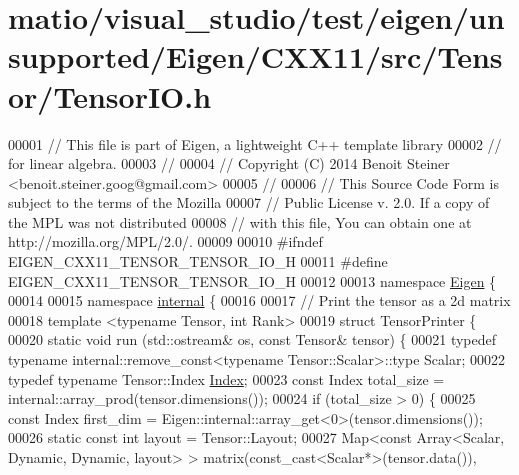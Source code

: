 \hypertarget{matio_2visual__studio_2test_2eigen_2unsupported_2_eigen_2_c_x_x11_2src_2_tensor_2_tensor_i_o_8h_source}{}\section{matio/visual\+\_\+studio/test/eigen/unsupported/\+Eigen/\+C\+X\+X11/src/\+Tensor/\+Tensor\+IO.h}
\label{matio_2visual__studio_2test_2eigen_2unsupported_2_eigen_2_c_x_x11_2src_2_tensor_2_tensor_i_o_8h_source}

\begin{DoxyCode}
00001 \textcolor{comment}{// This file is part of Eigen, a lightweight C++ template library}
00002 \textcolor{comment}{// for linear algebra.}
00003 \textcolor{comment}{//}
00004 \textcolor{comment}{// Copyright (C) 2014 Benoit Steiner <benoit.steiner.goog@gmail.com>}
00005 \textcolor{comment}{//}
00006 \textcolor{comment}{// This Source Code Form is subject to the terms of the Mozilla}
00007 \textcolor{comment}{// Public License v. 2.0. If a copy of the MPL was not distributed}
00008 \textcolor{comment}{// with this file, You can obtain one at http://mozilla.org/MPL/2.0/.}
00009 
00010 \textcolor{preprocessor}{#ifndef EIGEN\_CXX11\_TENSOR\_TENSOR\_IO\_H}
00011 \textcolor{preprocessor}{#define EIGEN\_CXX11\_TENSOR\_TENSOR\_IO\_H}
00012 
00013 \textcolor{keyword}{namespace }\hyperlink{namespace_eigen}{Eigen} \{
00014 
00015 \textcolor{keyword}{namespace }\hyperlink{namespaceinternal}{internal} \{
00016 
00017 \textcolor{comment}{// Print the tensor as a 2d matrix}
00018 \textcolor{keyword}{template} <\textcolor{keyword}{typename} Tensor, \textcolor{keywordtype}{int} Rank>
00019 \textcolor{keyword}{struct }TensorPrinter \{
00020   \textcolor{keyword}{static} \textcolor{keywordtype}{void} run (std::ostream& os, \textcolor{keyword}{const} Tensor& tensor) \{
00021     \textcolor{keyword}{typedef} \textcolor{keyword}{typename} internal::remove\_const<typename Tensor::Scalar>::type Scalar;
00022     \textcolor{keyword}{typedef} \textcolor{keyword}{typename} Tensor::Index \hyperlink{namespace_eigen_a62e77e0933482dafde8fe197d9a2cfde}{Index};
00023     \textcolor{keyword}{const} Index total\_size = internal::array\_prod(tensor.dimensions());
00024     \textcolor{keywordflow}{if} (total\_size > 0) \{
00025       \textcolor{keyword}{const} Index first\_dim = Eigen::internal::array\_get<0>(tensor.dimensions());
00026       \textcolor{keyword}{static} \textcolor{keyword}{const} \textcolor{keywordtype}{int} layout = Tensor::Layout;
00027       Map<const Array<Scalar, Dynamic, Dynamic, layout> > matrix(const\_cast<Scalar*>(tensor.data()), 

\end{DoxyCode}
